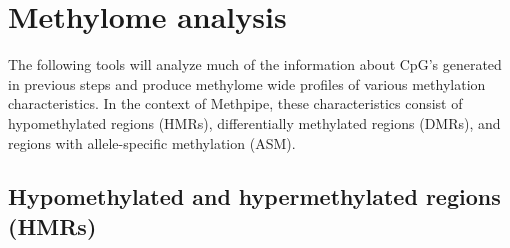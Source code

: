 \documentclass[10pt]{article}
\begin{document}




\section{Methylome analysis}
\label{sec:high-level-analys}

The following tools will analyze much of the information about CpG's
generated in previous steps and produce methylome wide profiles of
various methylation characteristics. In the context of Methpipe, these
characteristics consist of hypomethylated regions (HMRs),
differentially methylated regions (DMRs), and regions with
allele-specific methylation (ASM).

\subsection{Hypomethylated and hypermethylated regions (HMRs)}
\label{sec:ident-hypo-methyl}
\end{document}

